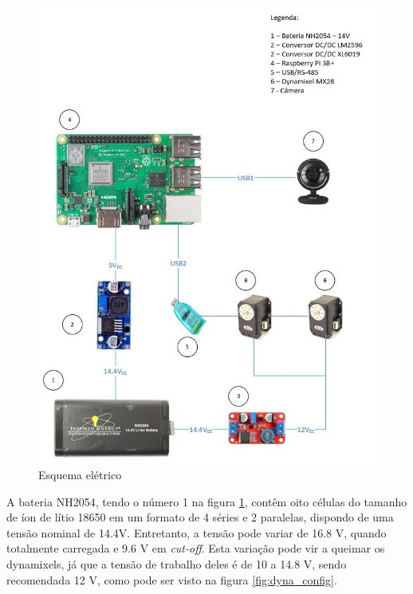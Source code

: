 \begin{figure}[H]
	\centering
	\includegraphics[scale=0.7, angle=0]{Figures/diagrama.jpeg}
	\caption{Esquema elétrico}
	\label{fig:esq_ele}
\end{figure}

 A bateria NH2054, tendo o número 1 na figura \ref{fig:esq_ele}, contêm oito células do tamanho de íon de lítio 18650 em um formato de 4 séries e 2 paralelas, dispondo de uma tensão nominal de 14.4V. Entretanto, a tensão pode variar de 16.8 V, quando totalmente carregada e 9.6 V em \textit{cut-off}. Esta variação pode vir a queimar os dynamixels, já que a tensão de trabalho deles é de 10 a 14.8 V, sendo recomendada 12 V, como pode ser visto na figura \ref{fig:dyna_config}. 
 
